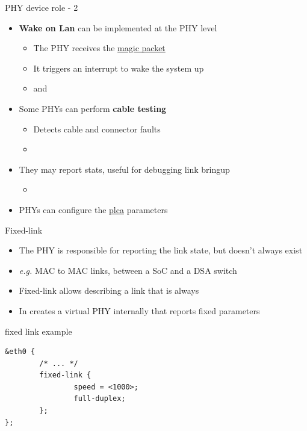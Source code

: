 \begin{frame}{PHY device role - 2}
	\begin{itemize}
		\item \textbf{Wake on Lan} can be implemented at the PHY level
			\begin{itemize}
				\item The PHY receives the \href{https://en.wikipedia.org/wiki/Wake-on-LAN\#Magic_packet}{magic packet}
				\item It triggers an interrupt to wake the system up
				\item {} and 
			\end{itemize}
		\item Some PHYs can perform \textbf{cable testing}
			\begin{itemize}
				\item Detects cable and connector faults
				\item {}
			\end{itemize}
		\item They may report stats, useful for debugging link bringup
			\begin{itemize}
				\item {}
			\end{itemize}
		\item \textbf{} PHYs can configure the \href{https://docs.kernel.org/networking/ethtool-netlink.html\#plca-get-cfg}{plca} parameters

	\end{itemize}
\end{frame}

\begin{frame}[fragile]{Fixed-link}
	\begin{itemize}
		\item The PHY is responsible for reporting the link state, but doesn't always exist
		\item \textit{e.g.} MAC to MAC links, between a SoC and a DSA switch
		\item Fixed-link allows describing a link that is always 
		\item In creates a virtual PHY internally that reports fixed parameters
	\end{itemize}
	\begin{block}{fixed link example}
		\begin{verbatim}
&eth0 {
        /* ... */
        fixed-link {
                speed = <1000>;
                full-duplex;
        };
};
		\end{verbatim}
	\end{block}
\end{frame}

